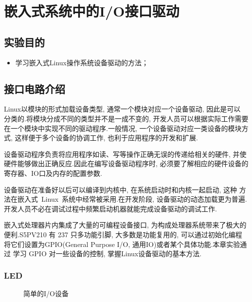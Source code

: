 \chapter{嵌入式系统中的I/O接口驱动}

\section{实验目的}
\begin{itemize}\itemsep=-3pt
  \item 学习嵌入式Linux操作系统设备驱动的方法；
\end{itemize}

\section{接口电路介绍}
	Linux以模块的形式加载设备类型, 通常一个模块对应一个设备驱动, 因此是可以
分类的.将模块分成不同的类型并不是一成不变的, 开发人员可以根据实际工作需要
在一个模块中实现不同的驱动程序.一般情况, 一个设备驱动对应一类设备的模块方式, 
这样便于多个设备的协调工作, 也利于应用程序的开发和扩展.

	设备驱动程序负责将应用程序如读、写等操作正确无误的传递给相关的硬件, 并使
硬件能够做出正确反应.因此在编写设备驱动程序时, 必须要了解相应的硬件设备的
寄存器、IO口及内存的配置参数.

	设备驱动在准备好以后可以编译到内核中, 在系统启动时和内核一起启动, 这种
方法在嵌入式~Linux~系统中经常被采用.在开发阶段, 设备驱动的动态加载更为普遍.
开发人员不必在调试过程中频繁启动机器就能完成设备驱动的调试工作.

	嵌入式处理器片内集成了大量的可编程设备接口, 为构成处理器系统带来了极大的
便利.S5PV210 有 237 只多功能引脚, 大多数是功能复用的, 可以通过初始化编程
将它们设置为GPIO(General Purpose I/O, 通用IO)或者某个具体功能.本章实验通过
学习 GPIO 对一些设备的控制, 掌握Linux设备驱动的基本方法.

\subsection{LED}
\begin{figure}
\centering
{}\hspace{5mm}
\caption{简单的I/O设备}\label{simple_IO}
\end{figure}

